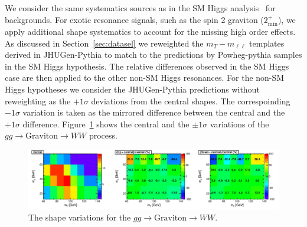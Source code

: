 We consider the same systematics sources as in the 
SM Higgs analysis~\cite{HWWHCP2012} for backgrounds. 
For exotic resonance signals, such as the spin 2 
graviton ($2_\text{min}^+$), we apply additional 
shape systematics to account for the missing high order effects. 
As discussed in Section~\ref{sec:datasel} we reweighted the $m_T-m_{\ell\ell}$ templates 
derived in JHUGen-Pythia to match to the predictions by Powheg-pythia samples in 
the SM Higgs hypothesis. 
The relative differences observed in the SM Higgs case are then 
applied to the other non-SM Higgs resonances. 
For the non-SM Higgs hypotheses we consider the JHUGen-Pythia 
predictions without reweighting as the $+1\sigma$ deviations from the central shapes. 
The correspoinding $-1\sigma$ variation is taken as the mirrored difference between 
the central and the $+1\sigma$ difference. 
Figure~\ref{fig:xwwshapevar} shows the central and the $\pm1\sigma$ variations 
of the $gg\to \text{Graviton}\to WW$ process. 

\begin{figure}[!hbtp]
\centering
\label{subfig:xwwshapevar}
\includegraphics[width=1.05\textwidth]{figures/xww_ggHshapevar.pdf}
\caption{The shape variations for the $gg\to \text{Graviton}\to WW$. 
}
\label{fig:xwwshapevar}
\end{figure}
